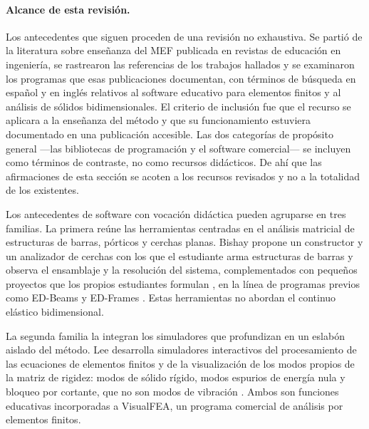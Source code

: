 \paragraph{Alcance de esta revisión.} Los antecedentes que siguen proceden de una revisión no exhaustiva. Se partió de la literatura sobre enseñanza del MEF publicada en revistas de educación en ingeniería, se rastrearon las referencias de los trabajos hallados y se examinaron los programas que esas publicaciones documentan, con términos de búsqueda en español y en inglés relativos al software educativo para elementos finitos y al análisis de sólidos bidimensionales. El criterio de inclusión fue que el recurso se aplicara a la enseñanza del método y que su funcionamiento estuviera documentado en una publicación accesible. Las dos categorías de propósito general —las bibliotecas de programación y el software comercial— se incluyen como términos de contraste, no como recursos didácticos. De ahí que las afirmaciones de esta sección se acoten a los recursos revisados y no a la totalidad de los existentes.

Los antecedentes de software con vocación didáctica pueden agruparse en tres familias. La primera reúne las herramientas centradas en el análisis matricial de estructuras de barras, pórticos y cerchas planas. Bishay propone un constructor y un analizador de cerchas con los que el estudiante arma estructuras de barras y observa el ensamblaje y la resolución del sistema, complementados con pequeños proyectos que los propios estudiantes formulan \autocite[pp.~5-6]{bishay2020teaching}, en la línea de programas previos como ED-Beams y ED-Frames \autocite[pp.~243-244]{suarez1998edelas2d}. Estas herramientas no abordan el continuo elástico bidimensional.

La segunda familia la integran los simuladores que profundizan en un eslabón aislado del método. Lee desarrolla simuladores interactivos del procesamiento de las ecuaciones de elementos finitos \autocite{lee2015interactive} y de la visualización de los modos propios de la matriz de rigidez: modos de sólido rígido, modos espurios de energía nula y bloqueo por cortante, que no son modos de vibración \autocite{lee2015eigenmodes}. Ambos son funciones educativas incorporadas a VisualFEA, un programa comercial de análisis por elementos finitos.

